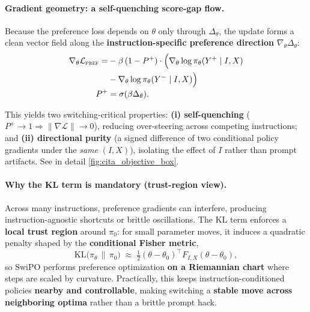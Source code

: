 \vspace{-0.35em}
\paragraph{Gradient geometry: a self-quenching score-gap flow.}
Because the preference loss depends on $\theta$ only through $\Delta_\theta$, the update forms a clean vector field along the
\textbf{instruction-specific preference direction} $\nabla_\theta \Delta_\theta$:
\[
\begin{aligned}
\nabla_{\theta}\mathcal{L}_{\textsc{pref}}
=&
-\beta\,(1-P^{+})\cdot\Big(\nabla_{\theta}\log \pi_{\theta}(Y^{+}\mid I,X)\\
&-\nabla_{\theta}\log \pi_{\theta}(Y^{-}\mid I,X)
\Big)
\\[-0.15em]
P^{+}&=\sigma(\beta\Delta_\theta).
\end{aligned}
\]







This yields two switching-critical properties: \textbf{(i) self-quenching} ($P^+\!\to1 \Rightarrow \|\nabla\mathcal{L}\|\to0$), reducing over-steering across competing instructions; and
\textbf{(ii) directional purity} (a signed difference of two conditional policy gradients under the \emph{same} $(I,X)$), isolating the effect of $I$ rather than prompt artifacts. See in detail \cref{fig:cita_objective_box}.

\vspace{-0.35em}
\paragraph{Why the KL term is mandatory (trust-region view).}
Across many instructions, preference gradients can interfere, producing instruction-agnostic shortcuts or brittle oscillations.
The KL term enforces a \textbf{local trust region} around $\pi_0$:
for small parameter moves, it induces a quadratic penalty shaped by the \textbf{conditional Fisher metric},
\vspace{-1mm}
\[
\mathrm{KL}\!\big(\pi_{\theta}\,\|\,\pi_{0}\big)
\;\approx\;
\tfrac{1}{2}(\theta-\theta_0)^{\top}F_{I,X}(\theta-\theta_0),
\]
\vspace{-1mm}
so SwiPO performs preference optimization \textbf{on a Riemannian chart} where steps are scaled by curvature.
Practically, this keeps instruction-conditioned policies \textbf{nearby and controllable}, making switching a \textbf{stable move across neighboring optima} rather than a brittle prompt hack.



